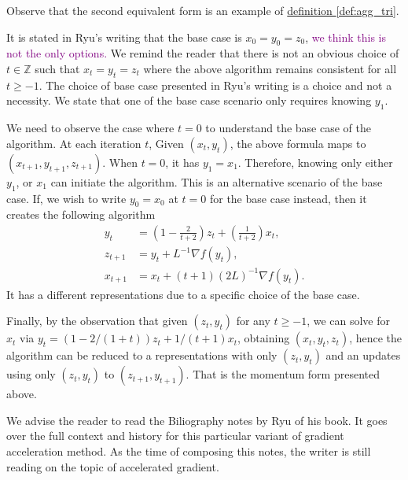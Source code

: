 \documentclass[12pt]{article}
\begin{document}
        \begin{observation}
            Observe that the second equivalent form is an example of \hyperref[def:agg_tri]{definition \ref*{def:agg_tri}}. 
            \par\noindent
            It is stated in Ryu's writing that the base case is $x_0 = y_0 = z_0$, 
            \textcolor{purple}{we think this is not the only options.} 
            We remind the reader that there is not an obvious choice of $t\in \mathbb Z$ such that $x_t = y_t = z_t$ where the above algorithm remains consistent for all $t \ge -1$. 
            The choice of base case presented in Ryu's writing is a choice and not a necessity. 
            We state that one of the base case scenario only requires knowing $y_1$. 

            \par\noindent 
            We need to observe the case where $t = 0$ to understand the base case of the algorithm. 
            At each iteration $t$, Given $(x_t, y_t)$, the above formula maps to $(x_{t + 1}, y_{t + 1}, z_{t + 1})$. 
            When $t= 0$, it has $y_1 = x_1$. 
            Therefore, knowing only either $y_1$, or $x_1$ can initiate the algorithm. 
            This is an alternative scenario of the base case. 
            If, we wish to write $y_0 = x_0$ at $t = 0$ for the base case instead, then it creates the following algorithm 
            \begin{align*}
                y_{t} &= \left(
                1 - \frac{2}{t + 2} 
                \right)z_{t} + 
                \left(
                    \frac{1}{t + 2}
                \right)x_{t}, 
                \\
                z_{t + 1} &= y_t + L^{-1}\nabla f(y_t), 
                \\
                x_{t + 1} &= x_t + (t + 1)(2L)^{-1}\nabla f(y_t). 
            \end{align*}
            It has a different representations due to a specific choice of the base case. 
            \par\noindent
            Finally, by the observation that given $(z_t, y_t)$ for any $t\ge -1$, we can solve for $x_t$ \newline via $y_t = (1 - 2/(1 + t))z_t + 1/(t + 1)x_t$, obtaining $(x_t, y_t, z_t)$, hence the algorithm can be reduced to a representations with only $(z_t, y_t)$ and an updates using only $(z_t, y_t)$ to $(z_{t + 1}, y_{t + 1})$. 
            That is the momentum form presented above. 
        \end{observation}
        We advise the reader to read the Biliography notes by Ryu \cite[chapter 12]{ryu_large-scale_2022} of his book. 
        It goes over the full context and history for this particular variant of gradient acceleration method. 
        As the time of composing this notes, the writer is still reading on the topic of accelerated gradient. 
\end{document}
